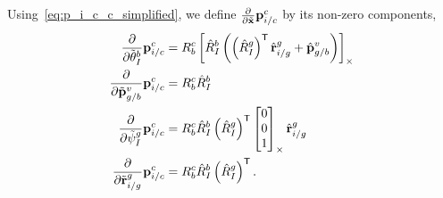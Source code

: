Using~\eqref{eq:p_i_c_c_simplified}, we define $\frac{\partial}{\partial \tilde{\mathrm{\mathbf{x}}}} \mathrm{\mathbf{p}}_{i/c}^c$ by its
non-zero components,
\begin{align}
  \frac{\partial}{\partial \tilde{\mathrm{\mathbf{\theta}}}_I^b } \mathrm{\mathbf{p}}_{i/c}^c
  &=
  R_b^c \left[  \hat{R}_I^b \left( \left( \hat{R}_I^g \right)^{\mathsf{T}}
  \hat{\mathrm{\mathbf{r}}}_{i/g}^g + \hat{\mathrm{\mathbf{p}}}_{g/b}^v \right)  \right]_{\times} \\
  \frac{\partial}{\partial \tilde{\mathrm{\mathbf{p}}}_{g/b}^v} \mathrm{\mathbf{p}}_{i/c}^c
  &=
  R_b^c \hat{R}_I^b \\
  \frac{\partial}{\partial \tilde{\psi}_I^g} \mathrm{\mathbf{p}}_{i/c}^c
  &=
  R_b^c \hat{R}_I^b \left( \hat{R}_I^g \right)^{\mathsf{T}}
  \left[ \begin{matrix} 0 \\ 0 \\ 1 \end{matrix} \right]_{\times} \hat{\mathrm{\mathbf{r}}}_{i/g}^g \\
  \frac{\partial}{\partial \tilde{\mathrm{\mathbf{r}}}_{i/g}^g} \mathrm{\mathbf{p}}_{i/c}^c
  &=
  R_b^c \hat{R}_I^b \left( \hat{R}_I^g \right)^{\mathsf{T}} .
\end{align}


